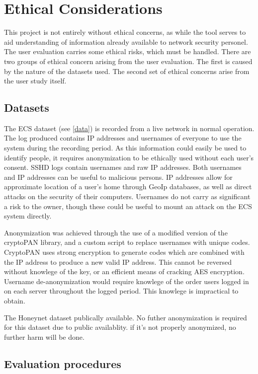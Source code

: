 \section{Ethical Considerations}

This project is not entirely without ethical concerns, as while the tool serves to aid understanding of information already available to network security personel. The user evaluation carries some ethical risks, which must be handled.
There are two groups of ethical concern arising from the user evaluation. The first is caused by the nature of the datasets used.  The second set of ethical concerns arise from the user study itself.

\subsection{Datasets}
The ECS dataset (see \ref{data}) is recorded from a live network in normal operation. The log produced contains IP addresses and usernames of everyone to use the system during the recording period. As this information could easily be used to identify people, it requires anonymization to be ethically used without each user's consent. SSHD logs contain usernames and raw IP addresses. Both usernames and IP addresses can be useful to malicious persons. IP addresses allow for approximate location of a user's home through GeoIp databases, as well as direct attacks on the security of their computers. Usernames do not carry as significant a risk to the owner, though these could be useful to mount an attack on the ECS system directly. 

Anonymization was achieved through the use of a modified version of the cryptoPAN \cite{xu2002prefix} library, and a custom script to replace usernames with unique codes. CryptoPAN uses strong encryption to generate codes which are combined with the IP address to produce a new valid IP address. This cannot be reversed without knowlege of the key, or an efficient means of cracking AES encryption. Username de-anonymization would require knowlege of the order users logged in on each server throughout the logged period. This knowlege is impractical to obtain. 

The Honeynet dataset publically available. No futher anonymization is required for this dataset due to public availablity. if it's not properly anonymized, no further harm will be done. 

\subsection{Evaluation procedures}

